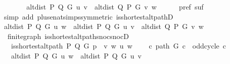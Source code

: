 \begin{isabellebody}
\ \ \isamarkupfalse%
\ \isamarkupfalse%
\ {\isachardoublequoteopen}{\isachardot}{\kern0pt}{\isachardot}{\kern0pt}{\isachardot}{\kern0pt}\ {\isacharequal}{\kern0pt}\ alt{\isacharunderscore}{\kern0pt}dist\ P\ Q\ G\ u\ v\ {\isacharplus}{\kern0pt}\ alt{\isacharunderscore}{\kern0pt}dist\ Q\ P\ G\ v\ w{\isachardoublequoteclose}\isanewline
\ \ \ \ \isamarkupfalse%
\ pref\ suf\isanewline
\ \ \ \ \isamarkupfalse%
\ {\isacharparenleft}{\kern0pt}simp\ add{\isacharcolon}{\kern0pt}\ plus{\isacharunderscore}{\kern0pt}enat{\isacharunderscore}{\kern0pt}simps{\isacharparenleft}{\kern0pt}{}{\isacharparenright}{\kern0pt}{\isacharbrackleft}{\kern0pt}symmetric{\isacharbrackright}{\kern0pt}\ is{\isacharunderscore}{\kern0pt}shortest{\isacharunderscore}{\kern0pt}alt{\isacharunderscore}{\kern0pt}pathD{\isacharparenleft}{\kern0pt}{}{\isacharparenright}{\kern0pt}{\isacharparenright}{\kern0pt}\isanewline
\ \ \isamarkupfalse%
\ \isamarkupfalse%
\ {\isachardoublequoteopen}alt{\isacharunderscore}{\kern0pt}dist\ P\ Q\ G\ u\ w\ {\isacharequal}{\kern0pt}\ alt{\isacharunderscore}{\kern0pt}dist\ P\ Q\ G\ u\ v\ {\isacharplus}{\kern0pt}\ alt{\isacharunderscore}{\kern0pt}dist\ Q\ P\ G\ v\ w{\isachardoublequoteclose}\isanewline
\ \ \ \ \isacommand{{\isachardot}{\kern0pt}}\isamarkupfalse%
\isanewline
{}\isamarkupfalse%
%
\endisatagproof
{\isafoldproof}%
%
\isadelimproof
\isanewline
%
\endisadelimproof
\isanewline
{}\isamarkupfalse%
\ {\isacharparenleft}{\kern0pt}\ finite{\isacharunderscore}{\kern0pt}graph{\isacharparenright}{\kern0pt}\ is{\isacharunderscore}{\kern0pt}shortest{\isacharunderscore}{\kern0pt}alt{\isacharunderscore}{\kern0pt}path{\isacharunderscore}{\kern0pt}snoc{\isacharunderscore}{\kern0pt}snocD{\isacharcolon}{\kern0pt}\isanewline
\ \ \ {\isachardoublequoteopen}is{\isacharunderscore}{\kern0pt}shortest{\isacharunderscore}{\kern0pt}alt{\isacharunderscore}{\kern0pt}path\ P\ Q\ G\ {\isacharparenleft}{\kern0pt}p\ {\isacharat}{\kern0pt}\ {\isacharbrackleft}{\kern0pt}v{\isacharcomma}{\kern0pt}\ w{\isacharbrackright}{\kern0pt}{\isacharparenright}{\kern0pt}\ u\ w{\isachardoublequoteclose}\isanewline
\ \ \ {\isachardoublequoteopen}{\isasymnot}\ {\isacharparenleft}{\kern0pt}{\isasymexists}c{\isachardot}{\kern0pt}\ path\ G\ c\ {\isasymand}\ odd{\isacharunderscore}{\kern0pt}cycle\ c{\isacharparenright}{\kern0pt}{\isachardoublequoteclose}\isanewline
\ \ \ {\isachardoublequoteopen}alt{\isacharunderscore}{\kern0pt}dist\ P\ Q\ G\ u\ w\ {\isacharequal}{\kern0pt}\ alt{\isacharunderscore}{\kern0pt}dist\ P\ Q\ G\ u\ v\ {\isacharplus}{\kern0pt}\ {}{\isachardoublequoteclose}\isanewline

\end{isabellebody}
